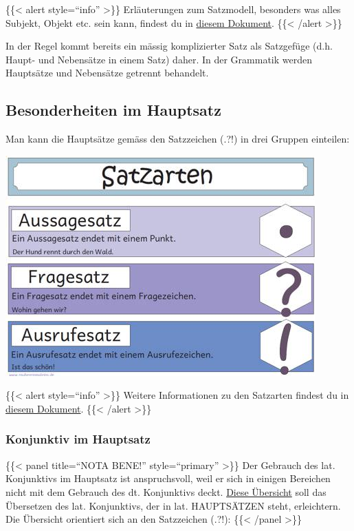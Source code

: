 \documentclass{scrartcl}
\begin{document}
\{\{< alert style="`info"' >\}\}
Erläuterungen zum Satzmodell, besonders was alles Subjekt, Objekt
etc. sein kann, findest du in \href{https://www.dropbox.com/s/id081k5itrib85b/Z19\_Satzmodell.pdf?dl=0}{diesem Dokument}.
\{\{< /alert >\}\}

In der Regel kommt bereits ein mässig komplizierter Satz als
Satzgefüge (d.h. Haupt- und Nebensätze in einem Satz) daher. In der
Grammatik werden Hauptsätze und Nebensätze getrennt behandelt.

\subsection{Besonderheiten im Hauptsatz}
\label{sec:orgb034a43}

Man kann die Hauptsätze gemäss den Satzzeichen (.?!) in drei Gruppen
einteilen:

\begin{center}
\includegraphics[width=.9\linewidth]{satzarten.jpg}
\label{org2ee0982}
\end{center}

\{\{< alert style="`info"' >\}\}
Weitere Informationen zu den Satzarten findest du in \href{https://www.dropbox.com/s/fskiu3e5rj485xp/Satzgrammatik.pdf?dl=0}{diesem Dokument}.
\{\{< /alert >\}\}

\subsubsection{Konjunktiv im Hauptsatz}
\label{sec:org929bdc1}

\{\{< panel title="`NOTA BENE!"' style="`primary"' >\}\} Der Gebrauch des lat. Konjunktivs im Hauptsatz ist anspruchsvoll,
weil er sich in einigen Bereichen nicht mit dem Gebrauch des
dt. Konjunktivs deckt. \href{https://www.dropbox.com/s/k03cq5ysu5of1ha/KonjunktivHS.pdf?dl=0}{Diese Übersicht} soll das Übersetzen des
lat. Konjunktivs, der in lat. HAUPTSÄTZEN steht, erleichtern. Die
Übersicht orientiert sich an den Satzzeichen (.?!):
\{\{< /panel >\}\}
\end{document}

